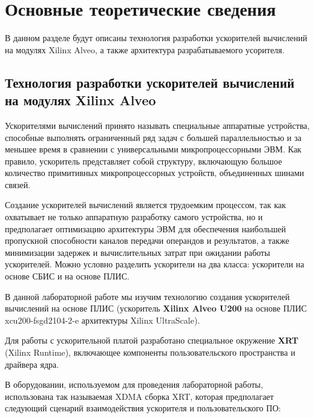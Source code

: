 \chapter{Основные теоретические сведения}

В данном разделе будут описаны технология разработки ускорителей вычислений на
модулях Xilinx Alveo, а также архитектура разрабатываемого усорителя.

\section{Технология разработки ускорителей вычислений на модулях Xilinx Alveo}

Ускорителями вычислений принято называть специальные аппаратные устройства,
способные выполнять ограниченный ряд задач с большей параллельностью и за
меньшее время в сравнении с универсальными микропроцессорными ЭВМ. Как
правило, ускоритель представляет собой структуру, включающую большое количество
примитивных микропроцессорных устройств, объединенных шинами связей.

Создание ускорителей вычислений является трудоемким процессом, так как
охватывает не только аппаратную разработку самого устройства, но и предполагает
оптимизацию архитектуры ЭВМ для обеспечения наибольшей пропускной способности
каналов передачи операндов и результатов, а также минимизации задержек и
вычислительных затрат при ожидании работы ускорителей. Можно условно разделить
ускорители на два класса: ускорители на основе СБИС и на основе ПЛИС.

В данной лабораторной работе мы изучим технологию создания ускорителей
вычислений на основе ПЛИС (ускоритель \textbf{Xilinx Alveo U200} на основе ПЛИС
xcu200-fsgd2104-2-e архитектуры Xilinx UltraScale).

Для работы с ускорительной платой разработано специальное окружение
\textbf{XRT} (Xilinx Runtime), включающее компоненты пользовательского
пространства и драйвера ядра.

В оборудовании, используемом для проведения лабораторной работы, использована
так называемая XDMA сборка XRT, которая предполагает следующий сценарий
взаимодействия ускорителя и пользовательского ПО:

